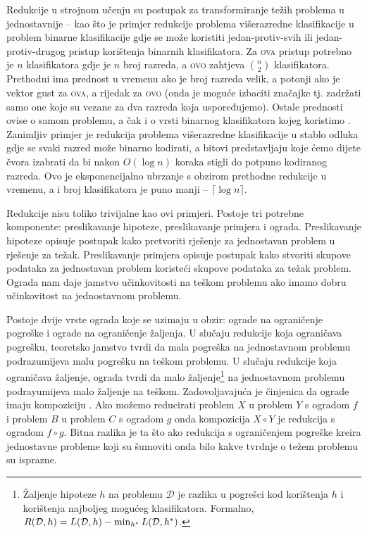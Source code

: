 Redukcije u strojnom učenju su postupak za transformiranje težih problema u
jednostavnije -- kao što je primjer redukcije problema višerazredne
klasifikacije u problem binarne klasifikacije gdje se može koristiti
jedan-protiv-svih  ili
jedan-protiv-drugog  pristup
korištenja binarnih klasifikatora. Za \textsc{ova} pristup potrebno je $n$
klasifikatora gdje je $n$ broj razreda, a \textsc{ovo} zahtjeva $\binom{n}{2}$
klasifikatora. Prethodni ima prednost u vremenu ako je broj razreda velik, a
potonji ako je vektor gust za \textsc{ova}, a rijedak za \textsc{ovo} (onda je
moguće izbaciti značajke tj. zadržati samo one koje su vezane za dva razreda
koja uspoređujemo). Ostale prednosti ovise o samom problemu, a čak i o vrsti
binarnog klasifikatora kojeg koristimo \citep{milgram2006one}. Zanimljiv primjer
je redukcija problema višerazredne klasifikacije u stablo odluka  gdje se svaki razred može binarno kodirati, a bitovi predstavljaju koje
ćemo dijete čvora izabrati da bi nakon $O(\log n)$ koraka stigli do potpuno
kodiranog razreda. Ovo je eksponencijalno ubrzanje s obzirom prethodne redukcije
u vremenu, a i broj klasifikatora je puno manji -- $\lceil \log n \rceil$.

Redukcije nisu toliko trivijalne kao ovi primjeri. Postoje tri potrebne
komponente: preslikavanje hipoteze, preslikavanje primjera i ograda.
Preslikavanje hipoteze opisuje postupak kako pretvoriti rješenje za jednostavan
problem u rješenje za težak. Preslikavanje primjera opisuje postupak kako
stvoriti skupove podataka za jednostavan problem koristeći skupove podataka za
težak problem. Ograda nam daje jamstvo učinkovitosti na teškom problemu ako
imamo dobru učinkovitost na jednostavnom problemu.

Postoje dvije vrste ograda koje se uzimaju u obzir: ograde na ograničenje
pogreške i ograde na ograničenje žaljenja. U slučaju redukcije koja ograničava
pogrešku, teoretsko jamstvo tvrdi da mala pogreška na jednostavnom problemu
podrazumijeva malu pogrešku na teškom problemu. U slučaju redukcije koja
ograničava žaljenje, ograda tvrdi da malo žaljenje\footnote{Žaljenje hipoteze
$h$ na problemu $\mathcal{D}$ je razlika u pogrešci kod korištenja $h$ i
korištenja najboljeg mogućeg klasifikatora. Formalno, $R(\mathcal{D}, h) =
L(\mathcal{D}, h) - \min_{h\ssymbol{1}} L(\mathcal{D}, h\ssymbol{1})$.} na
jednostavnom problemu podrayumijeva malo žaljenje na teškom. Zadovoljavajuća je
činjenica da ograde imaju kompoziciju \cite{beygelzimer2005error}. Ako možemo
reducirati problem $X$ u problem $Y$ s ogradom $f$ i problem $B$ u problem $C$ s
ogradom $g$ onda kompozicija $X \circ Y$ je redukcija s ogradom $f \circ g$.
Bitna razlika je ta što ako redukcija s ograničenjem pogreške kreira jednostavne
probleme koji su šumoviti onda bilo kakve tvrdnje o težem problemu su isprazne.

